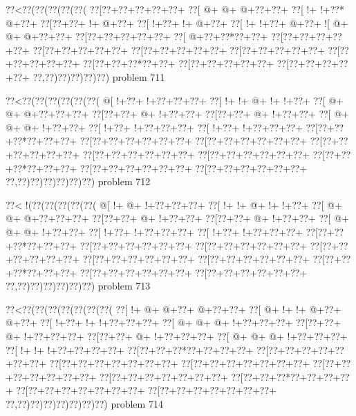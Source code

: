 \vbox{\vbox{\goo
\0??<\0??(\0??(\0??(\0??(\0??(
\0??[\0??+\0??+\0??+\0??+\0??+
\0??[\- @+\- @+\- @+\0??+\0??+
\0??[\- !+\- !+\0??*\- @+\0??+
\0??[\0??+\0??+\- !+\- @+\0??+
\0??[\- !+\0??+\- !+\- @+\0??+
\0??[\- !+\- !+\0??+\- @+\0??+
\- ![\- @+\- @+\- @+\0??+\0??+
\0??[\0??+\0??+\0??+\0??+\0??+
\0??[\- @+\0??+\0??*\0??+\0??+
\0??[\0??+\0??+\0??+\0??+\0??+
\0??[\0??+\0??+\0??+\0??+\0??+
\0??[\0??+\0??+\0??+\0??+\0??+
\0??[\0??+\0??+\0??+\0??+\0??+
\0??[\0??+\0??+\0??+\0??+\0??+
\0??[\0??+\0??+\0??*\0??+\0??+
\0??[\0??+\0??+\0??+\0??+\0??+
\0??[\0??+\0??+\0??+\0??+\0??+
\0??,\0??)\0??)\0??)\0??)\0??)
}
\hfil problem 711\hfil\break
}

\vbox{\vbox{\goo
\0??<\0??(\0??(\0??(\0??(\0??(\0??(
\- @[\- !+\0??+\- !+\0??+\0??+\0??+
\0??[\- !+\- !+\- @+\- !+\- !+\0??+
\0??[\- @+\- @+\- @+\0??+\0??+\0??+
\0??[\0??+\0??+\- @+\- !+\0??+\0??+
\0??[\0??+\0??+\- @+\- !+\0??+\0??+
\0??[\- @+\- @+\- @+\- !+\0??+\0??+
\0??[\- !+\0??+\- !+\0??+\0??+\0??+
\0??[\- !+\0??+\- !+\0??+\0??+\0??+
\0??[\0??+\0??+\0??*\0??+\0??+\0??+
\0??[\0??+\0??+\0??+\0??+\0??+\0??+
\0??[\0??+\0??+\0??+\0??+\0??+\0??+
\0??[\0??+\0??+\0??+\0??+\0??+\0??+
\0??[\0??+\0??+\0??+\0??+\0??+\0??+
\0??[\0??+\0??+\0??+\0??+\0??+\0??+
\0??[\0??+\0??+\0??*\0??+\0??+\0??+
\0??[\0??+\0??+\0??+\0??+\0??+\0??+
\0??[\0??+\0??+\0??+\0??+\0??+\0??+
\0??,\0??)\0??)\0??)\0??)\0??)\0??)
}
\hfil problem 712\hfil\break
}

\vbox{\vbox{\goo
\0??<\- !(\0??(\0??(\0??(\0??(\0??(
\- @[\- !+\- @+\- !+\0??+\0??+\0??+
\0??[\- !+\- !+\- @+\- !+\- !+\0??+
\0??[\- @+\- @+\- @+\0??+\0??+\0??+
\0??[\0??+\0??+\- @+\- !+\0??+\0??+
\0??[\0??+\0??+\- @+\- !+\0??+\0??+
\0??[\- @+\- @+\- @+\- !+\0??+\0??+
\0??[\- !+\0??+\- !+\0??+\0??+\0??+
\0??[\- !+\0??+\- !+\0??+\0??+\0??+
\0??[\0??+\0??+\0??*\0??+\0??+\0??+
\0??[\0??+\0??+\0??+\0??+\0??+\0??+
\0??[\0??+\0??+\0??+\0??+\0??+\0??+
\0??[\0??+\0??+\0??+\0??+\0??+\0??+
\0??[\0??+\0??+\0??+\0??+\0??+\0??+
\0??[\0??+\0??+\0??+\0??+\0??+\0??+
\0??[\0??+\0??+\0??*\0??+\0??+\0??+
\0??[\0??+\0??+\0??+\0??+\0??+\0??+
\0??[\0??+\0??+\0??+\0??+\0??+\0??+
\0??,\0??)\0??)\0??)\0??)\0??)\0??)
}
\hfil problem 713\hfil\break
}

\vbox{\vbox{\goo
\0??<\0??(\0??(\0??(\0??(\0??(\0??(\0??(
\0??[\- !+\- @+\- @+\0??+\- @+\0??+\0??+
\0??[\- @+\- !+\- !+\- @+\0??+\- @+\0??+
\0??[\- !+\0??+\- !+\- !+\0??+\0??+\0??+
\0??[\- @+\- @+\- @+\- !+\0??+\0??+\0??+
\0??[\0??+\0??+\- @+\- !+\0??+\0??+\0??+
\0??[\0??+\0??+\- @+\- !+\0??+\0??+\0??+
\0??[\- @+\- @+\- @+\- !+\0??+\0??+\0??+
\0??[\- !+\- !+\- !+\0??+\0??+\0??+\0??+
\0??[\0??+\0??+\0??*\0??+\0??+\0??+\0??+
\0??[\0??+\0??+\0??+\0??+\0??+\0??+\0??+
\0??[\0??+\0??+\0??+\0??+\0??+\0??+\0??+
\0??[\0??+\0??+\0??+\0??+\0??+\0??+\0??+
\0??[\0??+\0??+\0??+\0??+\0??+\0??+\0??+
\0??[\0??+\0??+\0??+\0??+\0??+\0??+\0??+
\0??[\0??+\0??+\0??*\0??+\0??+\0??+\0??+
\0??[\0??+\0??+\0??+\0??+\0??+\0??+\0??+
\0??[\0??+\0??+\0??+\0??+\0??+\0??+\0??+
\0??,\0??)\0??)\0??)\0??)\0??)\0??)\0??)
}
\hfil problem 714\hfil\break
}

